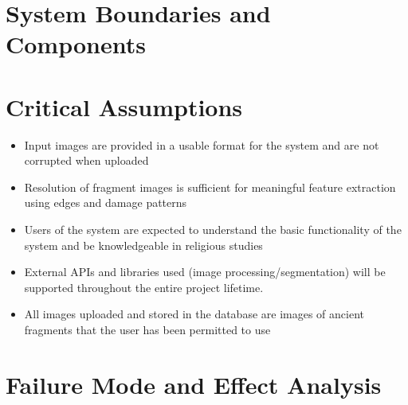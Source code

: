 \documentclass{article}
\begin{document}
\section{System Boundaries and Components}


\section{Critical Assumptions}

\begin{itemize}
    \item Input images are provided in a usable format for the system and are not corrupted when uploaded
    \item Resolution of fragment images is sufficient for meaningful feature extraction using edges and damage patterns
    \item Users of the system are expected to understand the basic functionality of the system and be knowledgeable in religious studies
    \item External APIs and libraries used (image processing/segmentation) will be supported throughout the entire project lifetime.
    \item All images uploaded and stored in the database are images of ancient fragments that the user has been permitted to use
\end{itemize}

\section{Failure Mode and Effect Analysis}
\end{document}

